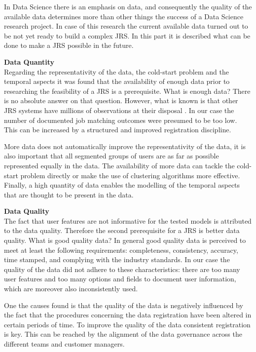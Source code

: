 In Data Science there is an emphasis on data, and consequently the quality of the available data determines more than other things the success of a Data Science research project.
In case of this research the current available data turned out to be not yet ready to build a complex JRS. 
In this part it is described what can be done to make a JRS possible in the future.

\noindent
\textbf{Data Quantity}\\
Regarding the representativity of the data, the cold-start problem and the temporal aspects it was found that the availability of enough data prior to researching the feasibility of a JRS is a prerequisite.
What is enough data?
There is no absolute answer on that question. 
However, what is known is that other JRS systems have millions of observations at their disposal \cite{kenthapadi2017personalized, T.Al-Otaibi2012ASystems, Zheng2012JobSurvey, hong2013job}.
In our case the number of documented job matching outcomes were presumed to be too low. 
This can be increased by a structured and improved registration discipline.

More data does not automatically improve the representativity of the data, it is also important that all segmented groups of users are as far as possible represented equally in the data.
The availability of more data can tackle the cold-start problem directly or make the use of clustering algorithms more effective. 
Finally, a high quantity of data enables the modelling of the temporal aspects that are thought to be present in the data.

\noindent
\textbf{Data Quality}\\
The fact that user features are not informative for the tested models is attributed to the data quality. 
Therefore the second prerequisite for a JRS is better data quality.
What is good quality data?
In general good quality data is perceived to meet at least the following requirements: completeness, consistency, accuracy, time stamped, and complying with the industry standards. 
In our case the quality of the data did not adhere to these characteristics: there are too many user features and too many options and fields to document user information, which are moreover also inconsistently used. 

One the causes found is that the quality of the data is negatively influenced by the fact that the procedures concerning the data registration have been altered in certain periods of time. 
To improve the quality of the data consistent registration is key.
This can be reached by the alignment of the data governance across the different teams and customer managers.

